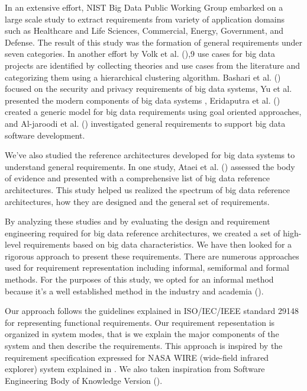 \documentclass[conference]{IEEEtran}
\begin{document}
In an extensive effort, NIST Big Data Public Working Group embarked on a large scale study to extract requirements from variety of application domains such as Healthcare and Life Sciences, Commercial, Energy, Government, and Defense. The result of this study was the formation of general requirements under seven categories. In another effort by Volk et al. (\cite{volk2020identifying}),9 use cases for big data projects are identified by collecting theories and use cases from the literature and categorizing them using a hierarchical clustering algorithm. Bashari et al. (\cite{bashari2016security}) focused on the security and privacy requirements of big data systems, Yu et al. presented the modern components of big data systems \cite{yu2019components}, Eridaputra et al. (\cite{eridaputra2014modeling}) created a generic model for big data requirements using goal oriented approaches, and Al-jaroodi et al. (\cite{al2016characteristics}) investigated general requirements to support big data software development. 

We've also studied the reference architectures developed for big data systems to understand general requirements. In one study, Ataei et al. (\cite{ataei2020big}) assessed the body of evidence and presented with a comprehensive list of big data reference architectures. This study helped us realized the spectrum of big data reference architectures, how they are designed and the general set of requirements.  

By analyzing these studies and by evaluating the design and requirement engineering required for big data reference architectures, we created a set of high-level requirements based on big data characteristics. We have then looked for a rigorous approach to present these requirements. There are numerous approaches used for requirement representation including informal, semiformal and formal methods. For the purposes of this study, we opted for an informal method because it's a well established method in the industry and academia (\cite{kassab2014state}). 

Our approach follows the guidelines explained in ISO/IEC/IEEE standard 29148 for representing functional requirements. Our requirement repesentation is organized in system modes, that is we explain the major components of the system and then describe the requirements. This approach is inspired by the requirement specification expressed for NASA WIRE (wide-field infrared explorer) system explained in \cite{laplante2017requirements}. We also taken inspiration from Software Engineering Body of Knowledge Version (\cite{abran2004software}).
\end{document}
